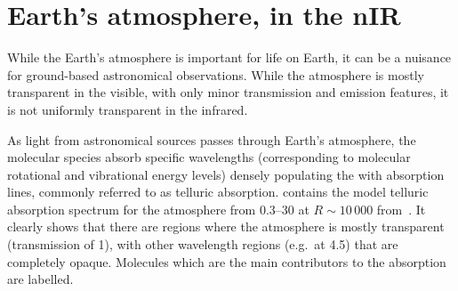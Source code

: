 
\section{Earth's atmosphere, in the nIR}

While the Earth's atmosphere is important for life on Earth, it can be a nuisance for ground-based astronomical observations.
While the atmosphere is mostly transparent in the visible, with only minor transmission and emission features, it is not uniformly transparent in the infrared.

As light from astronomical sources passes through Earth's atmosphere, the molecular species absorb specific wavelengths (corresponding to molecular rotational and vibrational energy levels) densely populating the \nir{} with absorption lines, commonly referred to as telluric absorption.
 contains the model telluric absorption spectrum for the atmosphere from 0.3--30\um{} at $R\sim10\,000$ from~\citet{smette_molecfit_2015}.
It clearly shows that there are regions where the atmosphere is mostly transparent (transmission of 1), with other wavelength regions (e.g.\ at 4.5\um{}) that are completely opaque.
Molecules which are the main contributors to the absorption are labelled.

